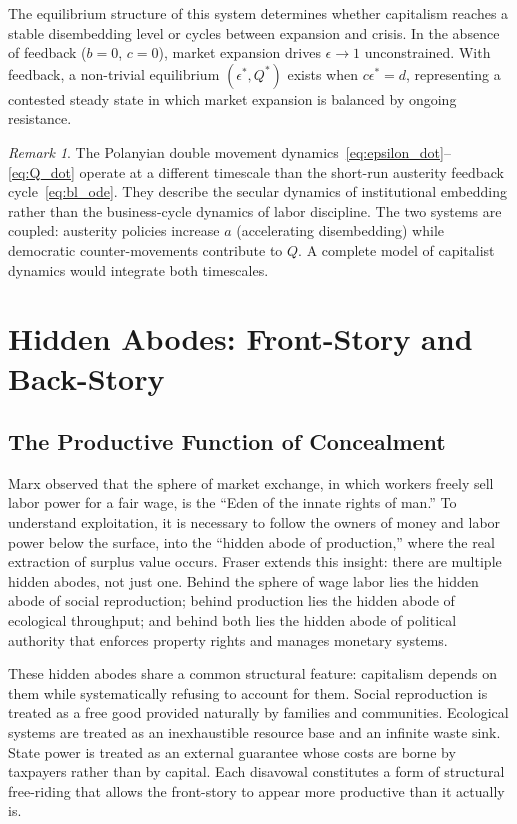 \documentclass[12pt,a4paper]{article}
\theoremstyle{definition}
\theoremstyle{remark}
\newtheorem{remark}{Remark}[section]
\begin{document}
The equilibrium structure of this system determines whether capitalism reaches a stable disembedding level or cycles between expansion and crisis. In the absence of feedback ($b = 0$, $c = 0$), market expansion drives $\epsilon \to 1$ unconstrained. With feedback, a non-trivial equilibrium $(\epsilon^*, Q^*)$ exists when $c\epsilon^* = d$, representing a contested steady state in which market expansion is balanced by ongoing resistance.

\begin{remark}
The Polanyian double movement dynamics~\eqref{eq:epsilon_dot}--\eqref{eq:Q_dot} operate at a different timescale than the short-run austerity feedback cycle~\eqref{eq:bl_ode}. They describe the secular dynamics of institutional embedding rather than the business-cycle dynamics of labor discipline. The two systems are coupled: austerity policies increase $a$ (accelerating disembedding) while democratic counter-movements contribute to $Q$. A complete model of capitalist dynamics would integrate both timescales.
\end{remark}

\section{Hidden Abodes: Front-Story and Back-Story}
\label{sec:hidden_abodes}

\subsection{The Productive Function of Concealment}

Marx observed that the sphere of market exchange, in which workers freely sell labor power for a fair wage, is the ``Eden of the innate rights of man.'' To understand exploitation, it is necessary to follow the owners of money and labor power below the surface, into the ``hidden abode of production,'' where the real extraction of surplus value occurs. Fraser extends this insight: there are multiple hidden abodes, not just one. Behind the sphere of wage labor lies the hidden abode of social reproduction; behind production lies the hidden abode of ecological throughput; and behind both lies the hidden abode of political authority that enforces property rights and manages monetary systems.

These hidden abodes share a common structural feature: capitalism depends on them while systematically refusing to account for them. Social reproduction is treated as a free good provided naturally by families and communities. Ecological systems are treated as an inexhaustible resource base and an infinite waste sink. State power is treated as an external guarantee whose costs are borne by taxpayers rather than by capital. Each disavowal constitutes a form of structural free-riding that allows the front-story to appear more productive than it actually is.
\end{document}
